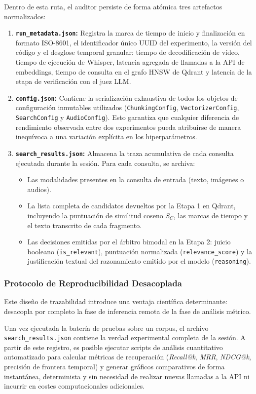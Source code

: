 Dentro de esta ruta, el auditor persiste de forma atómica tres artefactos normalizados:
\begin{enumerate}
    \item \textbf{\texttt{run\_metadata.json}:} Registra la marca de tiempo de inicio y finalización en formato ISO-8601, el identificador único UUID del experimento, la versión del código y el desglose temporal granular: tiempo de decodificación de vídeo, tiempo de ejecución de Whisper, latencia agregada de llamadas a la API de embeddings, tiempo de consulta en el grafo HNSW de Qdrant y latencia de la etapa de verificación con el juez LLM.
    \item \textbf{\texttt{config.json}:} Contiene la serialización exhaustiva de todos los objetos de configuración inmutables utilizados (\texttt{ChunkingConfig}, \texttt{VectorizerConfig}, \texttt{SearchConfig} y \texttt{AudioConfig}). Esto garantiza que cualquier diferencia de rendimiento observada entre dos experimentos pueda atribuirse de manera inequívoca a una variación explícita en los hiperparámetros.
    \item \textbf{\texttt{search\_results.json}:} Almacena la traza acumulativa de cada consulta ejecutada durante la sesión. Para cada consulta, se archiva:
    \begin{itemize}
        \item Las modalidades presentes en la consulta de entrada (texto, imágenes o audios).
        \item La lista completa de candidatos devueltos por la Etapa 1 en Qdrant, incluyendo la puntuación de similitud coseno $S_C$, las marcas de tiempo y el texto transcrito de cada fragmento.
        \item Las decisiones emitidas por el árbitro bimodal en la Etapa 2: juicio booleano (\texttt{is\_relevant}), puntuación normalizada (\texttt{relevance\_score}) y la justificación textual del razonamiento emitido por el modelo (\texttt{reasoning}).
    \end{itemize}
\end{enumerate}

\subsubsection{Protocolo de Reproducibilidad Desacoplada}
Este diseño de trazabilidad introduce una ventaja científica determinante: desacopla por completo la fase de inferencia remota de la fase de análisis métrico.

Una vez ejecutada la batería de pruebas sobre un corpus, el archivo \texttt{search\_results.json} contiene la verdad experimental completa de la sesión. A partir de este registro, es posible ejecutar scripts de análisis cuantitativo automatizado para calcular métricas de recuperación (\textit{Recall@k}, \textit{MRR}, \textit{NDCG@k}, precisión de frontera temporal) y generar gráficos comparativos de forma instantánea, determinista y sin necesidad de realizar nuevas llamadas a la API ni incurrir en costes computacionales adicionales.
